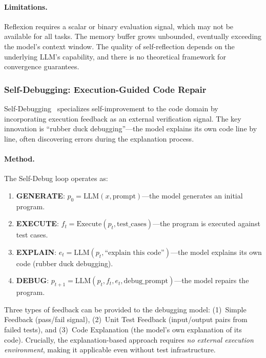 \paragraph{Limitations.}
Reflexion requires a scalar or binary evaluation signal, which may not be available for all tasks. The memory buffer grows unbounded, eventually exceeding the model's context window. The quality of self-reflection depends on the underlying LLM's capability, and there is no theoretical framework for convergence guarantees.

\subsubsection{Self-Debugging: Execution-Guided Code Repair}
\label{sec:self-debug}

Self-Debugging~\citep{chen2023selfdebug} specializes self-improvement to the code domain by incorporating execution feedback as an external verification signal. The key innovation is ``rubber duck debugging''---the model explains its own code line by line, often discovering errors during the explanation process.

\paragraph{Method.}
The Self-Debug loop operates as:

\begin{enumerate}
    \item \textbf{GENERATE}: $p_0 = \text{LLM}(x, \text{prompt})$---the model generates an initial program.
    \item \textbf{EXECUTE}: $f_t = \text{Execute}(p_t, \text{test\_cases})$---the program is executed against test cases.
    \item \textbf{EXPLAIN}: $e_t = \text{LLM}(p_t, \text{``explain this code''})$---the model explains its own code (rubber duck debugging).
    \item \textbf{DEBUG}: $p_{t+1} = \text{LLM}(p_t, f_t, e_t, \text{debug\_prompt})$---the model repairs the program.
\end{enumerate}

Three types of feedback can be provided to the debugging model: (1)~Simple Feedback (pass/fail signal), (2)~Unit Test Feedback (input/output pairs from failed tests), and (3)~Code Explanation (the model's own explanation of its code). Crucially, the explanation-based approach requires \emph{no external execution environment}, making it applicable even without test infrastructure.

